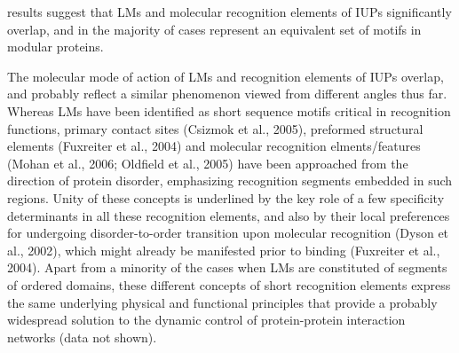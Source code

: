 results suggest that LMs and molecular recognition
elements of IUPs significantly overlap, and in the majority of
cases represent an equivalent set of motifs in modular proteins.

The molecular mode of action of
LMs and recognition elements of IUPs overlap, and probably
reflect a similar phenomenon viewed from different angles thus
far.
Whereas LMs have been identified as short sequence motifs
critical in recognition functions, primary contact sites (Csizmok
et al., 2005), preformed structural elements (Fuxreiter et al.,
2004) and molecular recognition elments/features (Mohan
et al., 2006; Oldfield et al., 2005) have been approached from
the direction of protein disorder, emphasizing recognition
segments embedded in such regions. Unity of these concepts
is underlined by the key role of a few specificity determinants in
all these recognition elements, and also by their local
preferences for undergoing disorder-to-order transition upon
molecular recognition (Dyson et al., 2002), which might already
be manifested prior to binding (Fuxreiter et al., 2004). Apart
from a minority of the cases when LMs are constituted of
segments of ordered domains, these different concepts of short
recognition elements express the same underlying physical and
functional principles that provide a probably widespread
solution to the dynamic control of protein-protein interaction
networks (data not shown).






